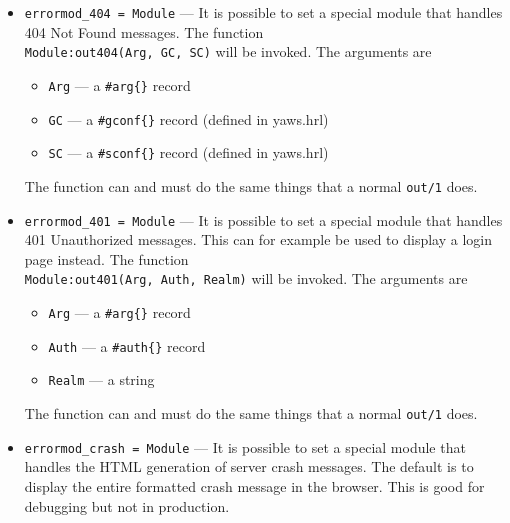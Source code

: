 \documentclass[11pt,oneside,english]{book}
\newcommand{\Yaws}            %
        {{\sc Yaws}}
\begin{document}
\begin{itemize}
              Note that when \verb+DispatchModule+ handles a request itself,
              \Yaws\  does not support tracing, increment statistics
              counters or allow traffic shaping for that request. It does
              however still keep track of maximum keepalive uses on the
              connection.

\item       \verb+errormod_404 = Module+ ---
              It is possible to set a special module that handles 404 Not Found
              messages. The function\\ \verb+Module:out404(Arg, GC, SC)+ will be
              invoked. The arguments are
              \begin{itemize}
              \item \verb+Arg+ --- a \verb+#arg{}+ record
              \item \verb+GC+ --- a \verb+#gconf{}+ record (defined in yaws.hrl)
              \item \verb+SC+ --- a \verb+#sconf{}+ record (defined in yaws.hrl)
              \end{itemize}
              The function can and must do the same things that a normal
              \verb+out/1+ does.

\item       \verb+errormod_401 = Module+ ---
              It is possible to set a special module that handles 401
              Unauthorized messages. This can for example be used to display a
              login page instead. The function \\
              \verb+Module:out401(Arg, Auth, Realm)+ will be invoked. The
              arguments are
              \begin{itemize}
              \item \verb+Arg+ --- a \verb+#arg{}+ record
              \item \verb+Auth+ --- a \verb+#auth{}+ record
              \item \verb+Realm+ --- a string
              \end{itemize}
              The function can and must do the same things that a normal
              \verb+out/1+ does.

\item       \verb+errormod_crash = Module+ ---
              It is possible to set a special module that handles the HTML
              generation of server crash messages. The default is to display the
              entire formatted crash message in the browser. This is good for
              debugging but not in production.


\end{itemize}
\end{document}
